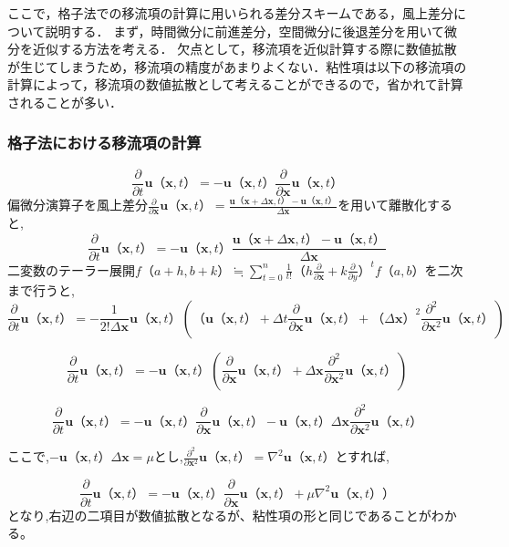\documentclass[a4j,12pt]{jreport}
\begin{document}
ここで，格子法での移流項の計算に用いられる差分スキームである，風上差分について説明する．
まず，時間微分に前進差分，空間微分に後退差分を用いて微分を近似する方法を考える．
欠点として，移流項を近似計算する際に数値拡散が生じてしまうため，移流項の精度があまりよくない．粘性項は以下の移流項の計算によって，移流項の数値拡散として考えることができるので，省かれて計算されることが多い．

\subsubsection{格子法における移流項の計算} \label{subsec:gridadvect}
$$\frac{\partial}{\partial t}\bm{u}（\bm{x},t） = -\bm{u}（\bm{x},t）\frac{\partial}{\partial \bm{x}}\bm{u}（\bm{x},t）$$
偏微分演算子を風上差分$\frac{\partial}{\partial \bm{x}}\bm{u}（\bm{x},t） = \frac{\bm{u}（\bm{x}+\varDelta \bm{x},t） - \bm{u}（\bm{x},t）}{\varDelta \bm{x}}$を用いて離散化すると,
$$\frac{\partial}{\partial t}\bm{u}（\bm{x},t） =  -\bm{u}（\bm{x},t）\frac{\bm{u}（\bm{x}+\varDelta \bm{x},t） - \bm{u}（\bm{x},t）}{\varDelta \bm{x}}$$
二変数のテーラー展開$f（a+h,b+k） \fallingdotseq \sum\limits_{t=0}^n \frac{1}{t!}（h\frac{\partial}{\partial \bm{x}} + k\frac{\partial}{\partial y}）^t f（a,b）$を二次まで行うと,
$$\frac{\partial}{\partial t}\bm{u}（\bm{x},t） = -\frac{1}{2!\varDelta \bm{x}}\bm{u}（\bm{x},t）\left( （\bm{u}（\bm{x},t）+\varDelta t\frac{\partial}{\partial \bm{x}}\bm{u}（\bm{x},t） + （\varDelta \bm{x}）^2\frac{\partial^2}{\partial \bm{x}^2}\bm{u}（\bm{x},t） \right)$$
            
$$\frac{\partial}{\partial t}\bm{u}（\bm{x},t） =  -\bm{u}（\bm{x},t）\left(\frac{\partial}{\partial \bm{x}}\bm{u}（\bm{x},t） + \varDelta \bm{x}\frac{\partial^2}{\partial \bm{x}^2}\bm{u}（\bm{x},t） \right)$$

$$ \frac{\partial}{\partial t}\bm{u}（\bm{x},t） =  -\bm{u}（\bm{x},t）\frac{\partial}{\partial \bm{x}}\bm{u}（\bm{x},t） -\bm{u}（\bm{x},t）\varDelta \bm{x}\frac{\partial^2}{\partial \bm{x}^2}\bm{u}（\bm{x},t）$$

ここで,$ -\bm{u}（\bm{x},t）\varDelta \bm{x} = \mu$とし,$\frac{\partial^2}{\partial \bm{x}^2}\bm{u}（\bm{x},t） = \nabla^2\bm{u}（\bm{x},t）$とすれば,

$$ \frac{\partial}{\partial t}\bm{u}（\bm{x},t） =  -\bm{u}（\bm{x},t）\frac{\partial}{\partial \bm{x}}\bm{u}（\bm{x},t） +\mu\nabla^2\bm{u}（\bm{x},t））$$
となり,右辺の二項目が数値拡散となるが、粘性項の形と同じであることがわかる。
\end{document}
